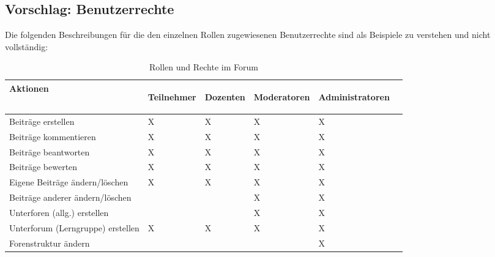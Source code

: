 
\subsection*{Vorschlag: Benutzerrechte} %
\label{sub:vorschlag_rollen_und_rechte}

Die folgenden Beschreibungen für die den einzelnen Rollen zugewiesenen Benutzerrechte sind als Beispiele zu verstehen und nicht vollständig:

\begin{table}[H]
\begin{center}
\begin{footnotesize}
\begin{tabular}{| l | C{1cm} | C{1cm} | C{1cm} | C{1cm} | C{1cm} |}  \hline                       
  \textbf{Aktionen} & 
	\begin{turn}{90}\textbf{Teilnehmer\vspace{0.1cm}}\end{turn} & 
	\begin{turn}{90}\textbf{Dozenten}\end{turn}  & 
	\begin{turn}{90}\textbf{Moderatoren}\end{turn} & 
	\begin{turn}{90}\textbf{Administratoren}\end{turn} \\ \hline 
	Beiträge erstellen					& X   & X   & X  & X    \\  \hline  
	Beiträge kommentieren		& X   & X   & X  & X    \\  \hline  
	Beiträge beantworten		& X   & X   & X  & X    \\  \hline  
	Beiträge bewerten		& X   & X   & X  & X    \\  \hline  
	Eigene Beiträge ändern/löschen		& X   & X   & X  & X    \\  \hline  
	Beiträge anderer ändern/löschen		&     &     & X  & X    \\  \hline  
	Unterforen (allg.) erstellen		&     &     & X  & X    \\  \hline  
	Unterforum (Lerngruppe) erstellen		&  X   & X    & X  & X    \\  \hline  
	Forenstruktur ändern	&     &     &   & X    \\  \hline  
\end{tabular}
\end{footnotesize}
\caption{Rollen und Rechte im Forum}
\label{tab:rundrforum}
\end{center}
\end{table}

